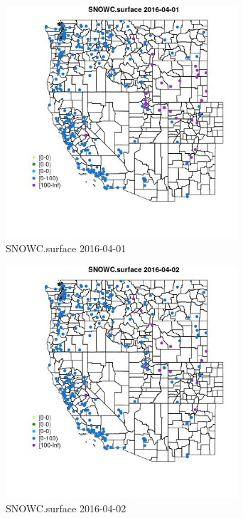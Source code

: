 \begin{figure} 
\centering  
\includegraphics[width=0.77\textwidth]{Code_Outputs/Report_ML_input_PM25_Step4_part_e_de_duplicated_aveswNAs_MapObsSNOWCsurface2016-04-01.jpg} 
\caption{\label{fig:Report_ML_input_PM25_Step4_part_e_de_duplicated_aveswNAsMapObsSNOWCsurface2016-04-01}SNOWC.surface 2016-04-01} 
\end{figure} 
 

\clearpage 

\begin{figure} 
\centering  
\includegraphics[width=0.77\textwidth]{Code_Outputs/Report_ML_input_PM25_Step4_part_e_de_duplicated_aveswNAs_MapObsSNOWCsurface2016-04-02.jpg} 
\caption{\label{fig:Report_ML_input_PM25_Step4_part_e_de_duplicated_aveswNAsMapObsSNOWCsurface2016-04-02}SNOWC.surface 2016-04-02} 
\end{figure} 
 

